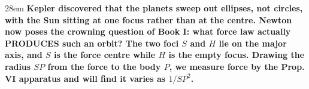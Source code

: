 \documentclass[border=4pt]{standalone}
\begin{document}
\begin{varwidth}{28em}
\large\bfseries
Kepler discovered that the planets sweep out ellipses, not circles,      with the Sun sitting at one focus rather than at the centre. Newton now poses      the crowning question of Book I: what force law actually PRODUCES such an orbit?      The two foci $S$ and $H$ lie on the major axis, and $S$ is the force      centre while $H$ is the empty focus. Drawing the radius $SP$ from the      force to the body $P$, we measure force by the Prop. VI apparatus and will find      it varies as $1/SP^2$.
\end{varwidth}
\end{document}
